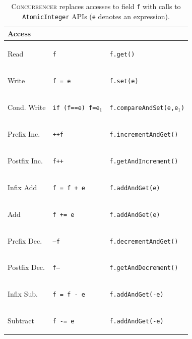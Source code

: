 \documentclass[10pt,twocolumn]{article}
\newcommand{\tool}{\begin{scriptsize}\textsc{Concurrencer}\end{scriptsize}\xspace}
\newcommand{\toolx}{{\smaller\textsc{Concurrencer}}\xspace}
\newcommand{\code}[1]{\begin{smaller}\texttt{#1}\end{smaller}}
\newcommand{\codex}[1]{{\smaller\texttt{#1}}\xspace}
\begin{document}
\begin{table}
\setlength{\tabcolsep}{.8\tabcolsep}
\centering
{%
\begin{tabular}{l|l|l} 
  {\textbf{Access}}       & {\textbf{\code{int}}} & {\textbf{\code{AtomicInteger}}} \\ \hline
  Read                    & \code{f}              & \code{f.get()}                          \\ 
  Write                   & \code{f = e}          & \code{f.set(e)}                         \\ 
  Cond. Write             &\code{if (f==e) f=e$_{\textrm{1}}$} &\code{f.compareAndSet(e,e$_{\textrm{1}}$)}     \\
  Prefix Inc.             & \code{++f}            & \code{f.incrementAndGet()}              \\
  Postfix Inc.            & \code{f++}            & \code{f.getAndIncrement()}              \\
  Infix Add               & \code{f = f + e}      & \code{f.addAndGet(e)}                   \\
  Add                     & \code{f += e}         & \code{f.addAndGet(e)}                   \\
  Prefix Dec.             & \code{--f}            & \code{f.decrementAndGet()}              \\
  Postfix Dec.            & \code{f--}            & \code{f.getAndDecrement()}              \\
  Infix Sub.              & \code{f = f - e}      & \code{f.addAndGet(-e)}                  \\
  Subtract                & \code{f -= e}         & \code{f.addAndGet(-e)}                  \\ 
\end{tabular}
}
\caption{\toolx replaces accesses to field \codex{f} with calls to \codex{AtomicInteger} APIs (\codex{e} denotes an expression).}
\label{tab:AtomicIntegerAccesses}
\end{table}

\end{document}

